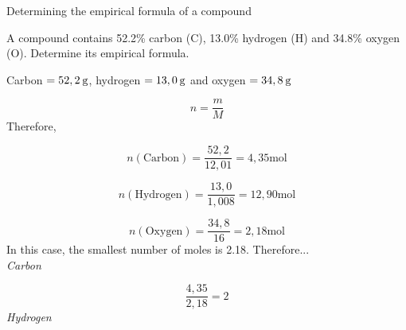     \noindent
\label{m38712*secfhsst!!!underscore!!!id1029}\vspace{.5cm} 
      \noindent 
      \begin{wex}{Determining the empirical formula of a compound }{
      \label{m38712*probfhsst!!!underscore!!!id1030}
      \label{m38712*id280897}A compound contains 52.2\% carbon ($\mathrm{C}$), 13.0\% hydrogen ($\mathrm{H}$) and 34.8\% oxygen ($\mathrm{O}$). Determine its empirical formula.\par 
      \vspace{5pt}
}
{ %
      \label{m38712*id280928}Carbon $=52,2\phantom{\rule{2pt}{0ex}}\mathrm{g}$, hydrogen $=13,0\phantom{\rule{2pt}{0ex}}\mathrm{g}$ and oxygen $=34,8\phantom{\rule{2pt}{0ex}}\mathrm{g}$\par 
      \label{m38712*id280954}\nopagebreak\noindent{}
        
    \begin{equation}
    n=\frac{m}{M}\tag{18.23}
      \end{equation}
      \label{m38712*id280975}Therefore,\par 
      \label{m38712*id280978}\nopagebreak\noindent{}
        
    \begin{equation}
    n\left(\mathrm{Carbon}\right)=\frac{52,2}{12,01}=4,35\mathrm{mol}\tag{18.24}
      \end{equation}
      \label{m38712*id281042}\nopagebreak\noindent{}
        
    \begin{equation}
    n\left(\mathrm{Hydrogen}\right)=\frac{13,0}{1,008}=12,90\mathrm{mol}\tag{18.25}
      \end{equation}
      \label{m38712*id281111}\nopagebreak\noindent{}
        
    \begin{equation}
    n\left(\mathrm{Oxygen}\right)=\frac{34,8}{16}=2,18\mathrm{mol}\tag{18.26}
      \end{equation}
In this case, the smallest number of moles is 2.18. Therefore... \\ 
      \label{m38712*id281179}
        \textsl{Carbon}
      \par 
      \label{m38712*id281185}\nopagebreak\noindent{}
        
    \begin{equation}
    \frac{4,35}{2,18}=2\tag{18.27}
      \end{equation}
      \label{m38712*id281217}
        \textsl{Hydrogen}
      \par 
      \label{m38712*id281223}\nopagebreak\noindent{}
        
}
\end{wex}
